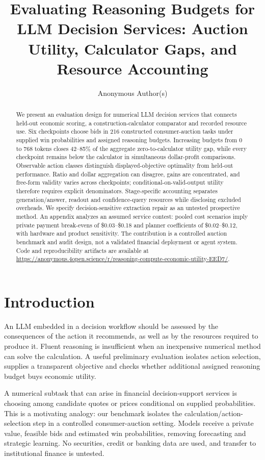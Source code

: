 \documentclass[sigconf,anonymous,nonacm]{acmart}
\title[Reasoning Budgets for LLM Decision Services]{Evaluating Reasoning Budgets for LLM Decision Services: Auction Utility, Calculator Gaps, and Resource Accounting}
\author{Anonymous Author(s)}
\begin{document}
\begin{abstract}
We present an evaluation design for numerical LLM decision services that connects held-out economic scoring, a construction-calculator comparator and recorded resource use. Six checkpoints choose bids in 216 constructed consumer-auction tasks under supplied win probabilities and assigned reasoning budgets. Increasing budgets from 0 to 768 tokens closes 42--85\% of the aggregate zero-to-calculator utility gap, while every checkpoint remains below the calculator in simultaneous dollar-profit comparisons. Observable action classes distinguish displayed-objective optimality from held-out performance. Ratio and dollar aggregation can disagree, gains are concentrated, and free-form validity varies across checkpoints; conditional-on-valid-output utility therefore requires explicit denominators. Stage-specific accounting separates generation/answer, readout and confidence-query resources while disclosing excluded overheads. We specify decision-sensitive extraction repair as an untested prospective method. An appendix analyzes an assumed service contest: pooled cost scenarios imply private payment break-evens of \$0.03--\$0.18 and planner coefficients of \$0.02--\$0.12, with hardware and product sensitivity. The contribution is a controlled auction benchmark and audit design, not a validated financial deployment or agent system.
Code and reproducibility artifacts are available at \url{https://anonymous.4open.science/r/reasoning-compute-economic-utility-EED7/}.
\end{abstract}
\maketitle
\section{Introduction}
An LLM embedded in a decision workflow should be assessed by the consequences of the action it recommends, as well as by the resources required to produce it. Fluent reasoning is insufficient when an inexpensive numerical method can solve the calculation. A useful preliminary evaluation isolates action selection, supplies a transparent objective and checks whether additional assigned reasoning budget buys economic utility.

A numerical subtask that can arise in financial decision-support services is choosing among candidate quotes or prices conditional on supplied probabilities. This is a motivating analogy: our benchmark isolates the calculation/action-selection step in a controlled consumer-auction setting. Models receive a private value, feasible bids and estimated win probabilities, removing forecasting and strategic learning. No securities, credit or banking data are used, and transfer to institutional finance is untested.
\end{document}

